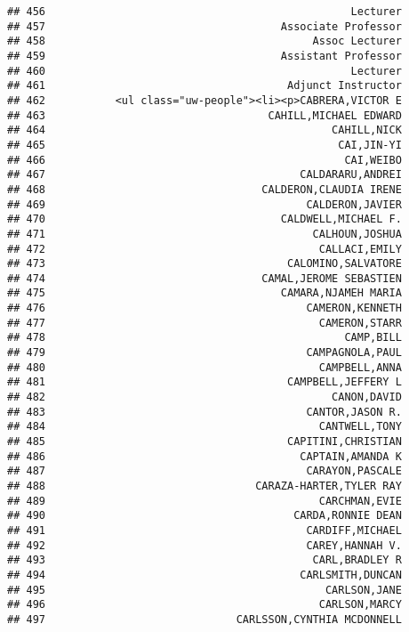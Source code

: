 \documentclass[
]{article}
\begin{document}
\begin{verbatim}
## 456                                                Lecturer
## 457                                     Associate Professor
## 458                                          Assoc Lecturer
## 459                                     Assistant Professor
## 460                                                Lecturer
## 461                                      Adjunct Instructor
## 462           <ul class="uw-people"><li><p>CABRERA,VICTOR E
## 463                                   CAHILL,MICHAEL EDWARD
## 464                                             CAHILL,NICK
## 465                                              CAI,JIN-YI
## 466                                               CAI,WEIBO
## 467                                        CALDARARU,ANDREI
## 468                                  CALDERON,CLAUDIA IRENE
## 469                                         CALDERON,JAVIER
## 470                                     CALDWELL,MICHAEL F.
## 471                                          CALHOUN,JOSHUA
## 472                                           CALLACI,EMILY
## 473                                      CALOMINO,SALVATORE
## 474                                  CAMAL,JEROME SEBASTIEN
## 475                                     CAMARA,NJAMEH MARIA
## 476                                         CAMERON,KENNETH
## 477                                           CAMERON,STARR
## 478                                               CAMP,BILL
## 479                                         CAMPAGNOLA,PAUL
## 480                                           CAMPBELL,ANNA
## 481                                      CAMPBELL,JEFFERY L
## 482                                             CANON,DAVID
## 483                                         CANTOR,JASON R.
## 484                                           CANTWELL,TONY
## 485                                      CAPITINI,CHRISTIAN
## 486                                        CAPTAIN,AMANDA K
## 487                                         CARAYON,PASCALE
## 488                                 CARAZA-HARTER,TYLER RAY
## 489                                           CARCHMAN,EVIE
## 490                                       CARDA,RONNIE DEAN
## 491                                         CARDIFF,MICHAEL
## 492                                         CAREY,HANNAH V.
## 493                                          CARL,BRADLEY R
## 494                                        CARLSMITH,DUNCAN
## 495                                            CARLSON,JANE
## 496                                           CARLSON,MARCY
## 497                              CARLSSON,CYNTHIA MCDONNELL

\end{verbatim}
\end{document}
